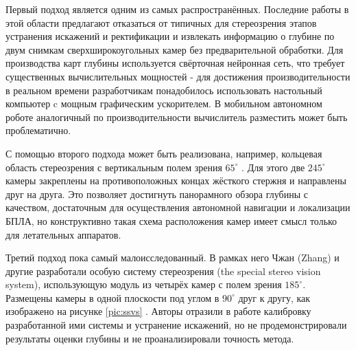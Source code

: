Первый подход является одним из самых распространённых. Последние работы в этой области предлагают \cite{direct_neuro_stereo} отказаться от типичных 
для стереозрения этапов устранения искажений и ректификации и извлекать информацию о глубине по двум снимкам сверхширокоугольных камер без 
предварительной обработки. Для производства карт глубины используется свёрточная нейронная сеть, что требует существенных вычислительных 
мощностей - для достижения производительности в реальном времени разработчикам понадобилось использовать настольный компьютер c мощным графическим ускорителем. 
В мобильном автономном роботе аналогичный по производительности вычислитель разместить может быть проблематично. 

С помощью второго подхода может быть реализована, например, кольцевая область стереозрения с вертикальным  %
полем зрения $65^\circ$ \cite{omni_stereo}. Для этого две $245^\circ$ камеры закреплены на противоположных концах жёсткого стержня 
и направлены друг на друга. Это позволяет достигнуть панорамного обзора глубины с качеством, достаточным для осуществления автономной навигации и
локализации БПЛА\cite{omni_copter}, но конструктивно такая схема расположения камер имеет смысл только для летательных аппаратов.  

Третий подход пока самый малоисследованный. В рамках него Чжан (Zhang) и другие разработали особую систему стереозрения (the special stereo vision 
system), использующую модуль из четырёх камер с полем зрения $185^\circ$. Размещены камеры в одной плоскости под углом в $90^\circ$ друг к другу, 
как изображено на рисунке \ref{pic:ssvs} \cite{zhang_system}. Авторы отразили в работе калибровку разработанной ими системы и устранение искажений, 
но не  продемонстрировали результаты оценки глубины и не проанализировали точность метода. 


\clearpage
\vspace{\baselineskip}
